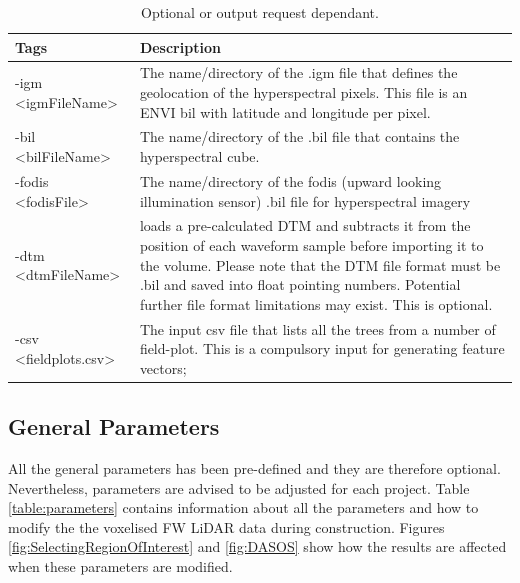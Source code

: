 \documentclass{subfiles}
\begin{document}
	
	\begin{table}
		\centering
		\begin{tabular}{|p{3.4cm}|p{10.1cm}|}
			\toprule
			\textbf{Tags}  & \textbf{Description}  \\
			\midrule
			-igm <igmFileName>  &  The name/directory of the .igm file that defines the geolocation of the hyperspectral pixels.  This file is an ENVI bil with latitude and longitude per pixel.\\
							\cmidrule(r){1-1}\cmidrule(l){2-2}
			-bil <bilFileName>  &  The name/directory of the .bil file that contains the hyperspectral cube.\\
							\cmidrule(r){1-1}\cmidrule(l){2-2}
			-fodis <fodisFile>   & The name/directory of the fodis (upward looking illumination sensor) .bil file for hyperspectral imagery \\
			\midrule
			\midrule
			-dtm <dtmFileName> & loads a pre-calculated DTM and subtracts it from the position of each waveform sample before importing it to the volume. Please note that the DTM file format must be .bil and saved into float pointing numbers. Potential further file format limitations may exist. This is optional. \\
			\midrule
			\midrule
			-csv <fieldplots.csv>  &  The input csv file that lists all the trees from a number of field-plot. This is a compulsory input for generating feature vectors;
				\\
			\bottomrule
		\end{tabular}
		\caption{Optional or output request dependant.}
		\label{table:DASOS_optional_inputs}
	\end{table}
		
			
			\newpage
		\subsection{General Parameters}\label{parameters}
			\par All the general parameters has been pre-defined and they are therefore optional. Nevertheless, parameters are advised to be adjusted for each project. Table \ref{table:parameters} contains information about all the parameters and how to modify the the voxelised FW LiDAR data during construction. Figures \ref{fig:SelectingRegionOfInterest} and \ref{fig:DASOS} show how the results are affected when these parameters are modified.
			
\end{document}
